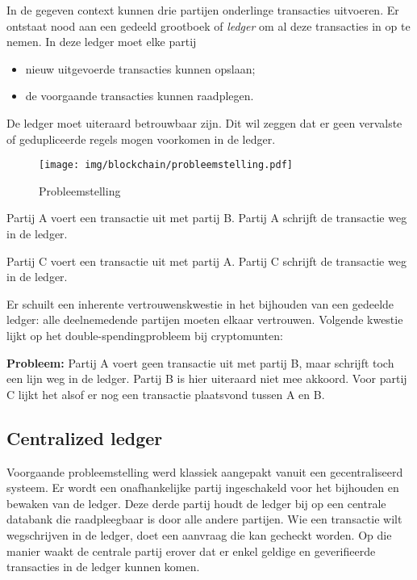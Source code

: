 In de gegeven context kunnen drie partijen onderlinge transacties uitvoeren. Er ontstaat nood aan een gedeeld grootboek of \textit{ledger} om al deze transacties in op te nemen. In deze ledger moet elke partij
\begin{itemize}
	\item nieuw uitgevoerde transacties kunnen opslaan;
	\item de voorgaande transacties kunnen raadplegen.
\end{itemize}

De ledger moet uiteraard betrouwbaar zijn. Dit wil zeggen dat er geen vervalste of gedupliceerde regels mogen voorkomen in de ledger.

\begin{figure}[H]
	\centering
	\texttt{[image: img/blockchain/probleemstelling.pdf]}
	\caption{\label{fig:probleemstelling}Probleemstelling}
\end{figure}

\begin{tcolorbox}[title=Voorbeeld]	
Partij A voert een transactie uit met partij B. Partij A schrijft de transactie weg in de ledger.

Partij C voert een transactie uit met partij A. Partij C schrijft de transactie weg in de ledger.
\end{tcolorbox}

Er schuilt een inherente vertrouwenskwestie in het bijhouden van een gedeelde ledger: alle deelnemedende partijen moeten elkaar vertrouwen. Volgende kwestie lijkt op het double-spendingprobleem bij cryptomunten:

\textbf{Probleem:} 
Partij A voert geen transactie uit met partij B, maar schrijft toch een lijn weg in de ledger. Partij B is hier uiteraard niet mee akkoord. Voor partij C lijkt het alsof er nog een transactie plaatsvond tussen A en B.


\subsection{Centralized ledger}
\label{sub:centralized-ledger}

Voorgaande probleemstelling werd klassiek aangepakt vanuit een gecentraliseerd systeem. Er wordt een onafhankelijke partij ingeschakeld voor het bijhouden en bewaken van de ledger. Deze derde partij houdt de ledger bij op een centrale databank die raadpleegbaar is door alle andere partijen. Wie een transactie wilt wegschrijven in de ledger, doet een aanvraag die kan gecheckt worden. Op die manier waakt de centrale partij erover dat er enkel geldige en geverifieerde transacties in de ledger kunnen komen. 

